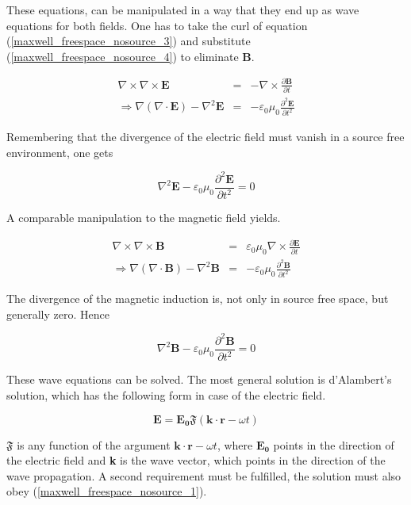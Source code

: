 \documentclass[a4paper,14pt]{extbook}
\begin{document}
These equations, can be manipulated in a way that they end up as wave equations for both fields. One has to take the curl of equation (\ref{maxwell_freespace_nosource_3}) and substitute (\ref{maxwell_freespace_nosource_4}) to eliminate \textbf{B}.

\begin{eqnarray}
\nabla \times \nabla \times \mathbf{E}&=& -\nabla \times \frac{\partial \mathbf{B}}{\partial t} \\
\Rightarrow \nabla ( \nabla \cdot \mathbf{E})- \nabla^2 \mathbf{E} &=& - \varepsilon_0 \mu_0 \frac{\partial^2 \mathbf{E}}{\partial t^2}
\end{eqnarray}


Remembering that the divergence of the electric field must vanish in a source free environment, one gets

\begin{equation}\label{wave_equation_E}
\nabla^2 \mathbf{E}-\varepsilon_0 \mu_0 \frac{\partial^2 \mathbf{E}}{\partial t^2}=0
\end{equation}

A comparable manipulation to the magnetic field yields.

\begin{eqnarray}
\nabla \times \nabla \times \mathbf{B}&=& \varepsilon_0 \mu_0 \nabla \times \frac{\partial \mathbf{E}}{\partial t} \\
\Rightarrow \nabla ( \nabla \cdot \mathbf{B})- \nabla^2 \mathbf{B}&=& -\varepsilon_0 \mu_0  \frac{\partial^2 \mathbf{B}}{\partial t^2}
\end{eqnarray}


The divergence of the magnetic induction is, not only in source free space, but generally zero. Hence

\begin{equation}\label{wave_equation_B}
\nabla^2 \mathbf{B}-\varepsilon_0 \mu_0 \frac{\partial^2 \mathbf{B}}{\partial t^2}=0
\end{equation}

These wave equations can be solved. The most general solution is d'Alambert's solution, which has the following form  in case of the electric field.

\begin{equation}\label{dAlambert}
\mathbf{E}=\mathbf{E_0}\mathfrak{F}(\mathbf{k}\cdot \mathbf{r} - \omega t)
\end{equation}

$\mathfrak{F}$ is any function of the argument $\mathbf{k}\cdot \mathbf{r}-\omega t$, where $\mathbf{E_0}$ points in the direction of the electric field and \textbf{k} is the wave vector, which points in the direction of the wave propagation. A second requirement must be fulfilled, the solution must also obey (\ref{maxwell_freespace_nosource_1}).
\end{document}
